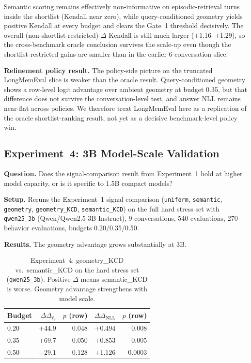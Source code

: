 \documentclass[conference]{IEEEtran}
\newcommand{\Logit}{\Delta_{\ell_2}}
\newcommand{\NLL}{\Delta_{\mathrm{NLL}}}
\begin{document}
Semantic scoring remains effectively non-informative on episodic-retrieval turns inside the shortlist (Kendall near zero), while query-conditioned geometry yields positive Kendall at every budget and clears the Gate~1 threshold decisively. The overall (non-shortlist-restricted) $\Delta$ Kendall is still much larger ($+1.16$--$+1.29$), so the cross-benchmark oracle conclusion survives the scale-up even though the shortlist-restricted gains are smaller than in the earlier 6-conversation slice.

\textbf{Refinement policy result.} The policy-side picture on the truncated LongMemEval slice is weaker than the oracle result. Query-conditioned geometry shows a row-level logit advantage over ambient geometry at budget 0.35, but that difference does not survive the conversation-level test, and answer NLL remains near-flat across policies. We therefore treat LongMemEval here as a replication of the oracle shortlist-ranking result, not yet as a decisive benchmark-level policy win.

\subsection{Experiment~4: 3B Model-Scale Validation}
\label{sec:3b_validation}
\textbf{Question.} Does the signal-comparison result from Experiment~1 hold at higher model capacity, or is it specific to 1.5B compact models?

\textbf{Setup.} Reruns the Experiment~1 signal comparison (\texttt{uniform}, \texttt{semantic}, \texttt{geometry}, \texttt{geometry\_KCD}, \texttt{semantic\_KCD}) on the full hard stress set with \texttt{qwen25\_3b} (Qwen/Qwen2.5-3B-Instruct), 9 conversations, 540 evaluations, 270 behavior evaluations, budgets 0.20/0.35/0.50.

\textbf{Results.} The geometry advantage grows substantially at 3B.

\begin{table}[t]
    \centering
    \caption{Experiment~4: geometry\_KCD vs.\ semantic\_KCD on the hard stress set (\texttt{qwen25\_3b}). Positive $\Delta$ means semantic\_KCD is worse. Geometry advantage strengthens with model scale.}
    \label{tab:exp4_3b}
    \begin{tabular}{lrrrr}
        \toprule
        Budget & $\Delta\Logit$ & $p$ (row) & $\Delta\NLL$ & $p$ (row) \\
        \midrule
        0.20 & $+44.9$ & $0.048$ & $+0.494$ & $0.008$ \\
        0.35 & $+69.7$ & $0.050$ & $+0.853$ & $0.005$ \\
        0.50 & $-29.1$ & $0.128$ & $+1.126$ & $\mathbf{0.0003}$ \\
        \bottomrule
    \end{tabular}
\end{table}
\end{document}
